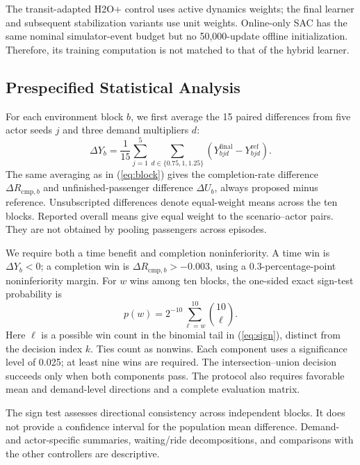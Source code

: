 \documentclass[letterpaper,journal]{IEEEtran}
\begin{document}
The transit-adapted H2O+ control uses active dynamics weights; the final learner and subsequent stabilization variants use unit weights. Online-only SAC has the same nominal simulator-event budget but no 50,000-update offline initialization. Therefore, its training computation is not matched to that of the hybrid learner.

\subsection{Prespecified Statistical Analysis}
For each environment block \(b\), we first average the 15 paired differences from five actor seeds \(j\) and three demand multipliers \(d\):
\begin{equation}
 \Delta Y_b=\frac{1}{15}\sum_{j=1}^{5}
       \sum_{d\in\{0.75,1,1.25\}}
       (Y^{\mathrm{final}}_{bjd}-Y^{\mathrm{ref}}_{bjd}).
 \label{eq:block}
\end{equation}
The same averaging as in (\ref{eq:block}) gives the completion-rate difference \(\Delta R_{\mathrm{cmp},b}\) and unfinished-passenger difference \(\Delta U_b\), always proposed minus reference. Unsubscripted differences denote equal-weight means across the ten blocks. Reported overall means give equal weight to the scenario--actor pairs. They are not obtained by pooling passengers across episodes.

We require both a time benefit and completion noninferiority. A time win is \(\Delta Y_b<0\); a completion win is \(\Delta R_{\mathrm{cmp},b}>-0.003\), using a 0.3-percentage-point noninferiority margin. For \(w\) wins among ten blocks, the one-sided exact sign-test probability is
\begin{equation}
 p(w)=2^{-10}\sum_{\ell=w}^{10}\binom{10}{\ell}.
 \label{eq:sign}
\end{equation}
Here \(\ell\) is a possible win count in the binomial tail in (\ref{eq:sign}), distinct from the decision index \(k\). Ties count as nonwins. Each component uses a significance level of 0.025; at least nine wins are required. The intersection--union decision succeeds only when both components pass. The protocol also requires favorable mean and demand-level directions and a complete evaluation matrix.

The sign test assesses directional consistency across independent blocks. It does not provide a confidence interval for the population mean difference. Demand- and actor-specific summaries, waiting/ride decompositions, and comparisons with the other controllers are descriptive.
\end{document}
